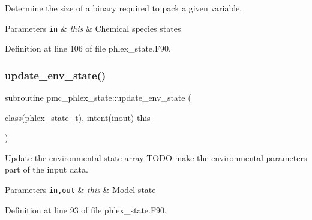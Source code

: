 Determine the size of a binary required to pack a given variable. 


\begin{DoxyParams}[1]{Parameters}
\mbox{\tt in}  & {\em this} & Chemical species states \\
\hline
\end{DoxyParams}


Definition at line 106 of file phlex\+\_\+state.\+F90.

\mbox{\label{namespacepmc__phlex__state_aaf068a64f451138607dc89796065f06f}} 
\subsubsection{\texorpdfstring{update\+\_\+env\+\_\+state()}{update\_env\_state()}}
{\footnotesize\ttfamily subroutine pmc\+\_\+phlex\+\_\+state\+::update\+\_\+env\+\_\+state (\begin{DoxyParamCaption}\item[{class(\mbox{\hyperlink{structpmc__phlex__state_1_1phlex__state__t}{phlex\+\_\+state\+\_\+t}}), intent(inout)}]{this }\end{DoxyParamCaption})\hspace{0.3cm}{\ttfamily [private]}}



Update the environmental state array T\+O\+DO make the environmental parameters part of the input data. 


\begin{DoxyParams}[1]{Parameters}
\mbox{\tt in,out}  & {\em this} & Model state \\
\hline
\end{DoxyParams}


Definition at line 93 of file phlex\+\_\+state.\+F90.


